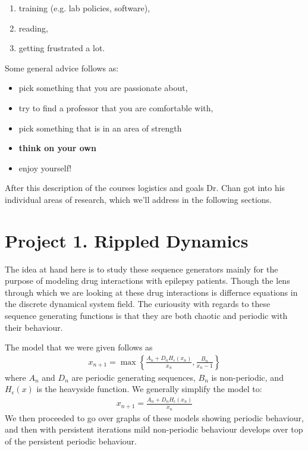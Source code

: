 \documentclass[12pt]{amsart}
\begin{document}
\begin{onehalfspace}
\begin{enumerate}
            \item training (e.g. lab policies, software),
            \item reading,
            \item getting frustrated a lot.
        \end{enumerate}
        Some general advice follows as:
        \begin{itemize}
            \item pick something that you are passionate about,
            \item try to find a professor that you are comfortable with,
            \item pick something that is in an area of strength
            \item \textbf{think on your own}
            \item enjoy yourself!
        \end{itemize}
        After this description of the courses logistics and goals Dr. Chan got into his individual areas of research,
        which we'll address in the following sections.

        \section{Project 1. Rippled Dynamics}
        The idea at hand here is to study these sequence generators mainly for the purpose of modeling drug
        interactions with epilepsy patients. Though the lens through which we are looking at these drug interactions
        is differnce equations in the discrete dynamical system field. The curiousity with regards to these sequence
        generating functions is that they are both chaotic and periodic with their behaviour.

        The model that we were given follows as
        \begin{align*}
            x_{n+1} = \max\left\{\frac{A_n + D_n H_{\epsilon}(x_n)}{x_n}, \frac{B_n}{x_n-1}\right\}
        \end{align*}
        where $A_n$ and $D_n$ are periodic generating sequences, $B_n$ is non-periodic, and $H_{\epsilon}(x)$
        is the heavyside function. We generally simplify the model to:
        \begin{align*}
            x_{n+1} = \frac{A_n + D_n H_{\epsilon}(x_n)}{x_n}
        \end{align*}
        We then proceeded to go over graphs of these models showing periodic behaviour, and then with persistent
        iterations mild non-periodic behaviour develops over top of the persistent periodic behaviour.


\end{onehalfspace}
\end{document}
